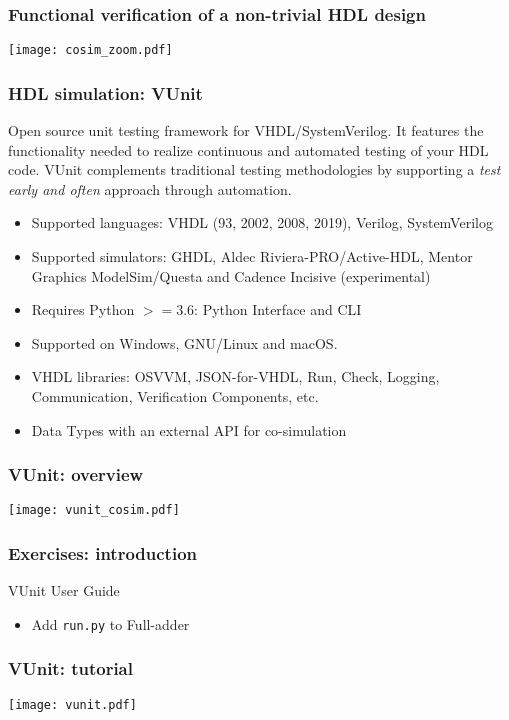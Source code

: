 \documentclass[xcolor={usenames,dvipsnames,svgnames}]{beamer}
\begin{document}
\begin{frame}
\frametitle{Functional verification of a non-trivial HDL design}
\centering
\texttt{[image: cosim\_zoom.pdf]}
\end{frame}

\begin{frame}
\frametitle{HDL simulation: VUnit}
\small
Open source unit testing framework for VHDL/SystemVerilog. It features the functionality needed to realize continuous and automated testing of your HDL code. VUnit complements traditional testing methodologies by supporting a \emph{test early and often} approach through automation.
\vfill
\begin{itemize}
  \item Supported languages: VHDL (93, 2002, 2008, 2019), Verilog, SystemVerilog
  \item Supported simulators: GHDL, Aldec Riviera-PRO/Active-HDL, Mentor Graphics ModelSim/Questa and Cadence Incisive (experimental)
  \item Requires Python $>=3.6$: Python Interface and CLI
  \item Supported on Windows, GNU/Linux and macOS.
  \item VHDL libraries: OSVVM, JSON-for-VHDL, Run, Check, Logging, Communication, Verification Components, etc.
  \item Data Types with an external API for co-simulation
\end{itemize}
\end{frame}

\begin{frame}
\frametitle{VUnit: overview}
\centering
\texttt{[image: vunit\_cosim.pdf]}
\end{frame}

\begin{frame}
\frametitle{Exercises: introduction}
\vfill
\begin{center}
VUnit User Guide \href{http://vunit.github.io/user_guide.html}{\faBook}
\end{center}
\vfill
\begin{itemize}
  \item Add \lstinline{run.py} to Full-adder
\end{itemize}
\vfill
\end{frame}

\begin{frame}
\frametitle{VUnit: tutorial}
\centering
\texttt{[image: vunit.pdf]}
\end{frame}
\end{document}

